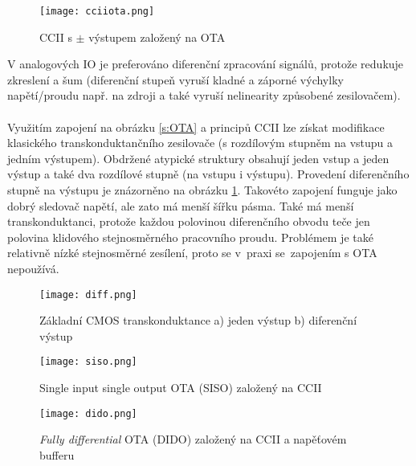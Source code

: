\begin{figure}[h]
\centering
\texttt{[image: cciiota.png]}
\caption[CCII s $\pm$ výstupem založený na OTA]{CCII s $\pm$ výstupem založený na OTA \cite{15}}
\end{figure}
\newline
V analogových IO je preferováno diferenční zpracování signálů, protože redukuje zkreslení a šum (diferenční stupeň vyruší kladné a záporné výchylky napětí/proudu např. na zdroji a také vyruší nelinearity způsobené zesilovačem).\\
\\
Využitím zapojení na obrázku \ref{s:OTA} a principů CCII lze získat modifikace klasického transkonduktančního zesilovače (s rozdílovým stupněm na vstupu a jedním výstupem). Obdržené atypické struktury obsahují jeden vstup a jeden výstup a také dva rozdílové stupně (na vstupu i výstupu). Provedení diferenčního stupně na výstupu je znázorněno na obrázku \ref{s:CMOS}. Takovéto zapojení funguje jako dobrý sledovač napětí, ale zato má menší šířku pásma. Také má menší transkonduktanci, protože každou polovinou diferenčního obvodu teče jen polovina klidového stejnosměrného pracovního proudu. Problémem je také relativně nízké stejnosměrné zesílení, proto se v~praxi se~zapojením s OTA nepoužívá. \\
\begin{figure}[h]
\centering
\texttt{[image: diff.png]}
\caption[Základní CMOS transkonduktance a) jeden výstup b) diferenční výstup]{Základní CMOS transkonduktance a) jeden výstup b) diferenční výstup \cite{13} \label{s:CMOS}}
\end{figure}
\begin{figure}[h]
\centering
\texttt{[image: siso.png]}
\caption[Single input single output OTA (SISO) založený na CCII]{Single input single output OTA (SISO) založený na CCII \cite{15}}
\end{figure}
\begin{figure}[h]
\centering
\texttt{[image: dido.png]}
\caption[\textit{Fully differential} OTA (DIDO) založený na CCII a napěťovém bufferu]{\textit{Fully differential} OTA (DIDO) založený na CCII a napěťovém bufferu \cite{15}}
\end{figure}
\newpage
